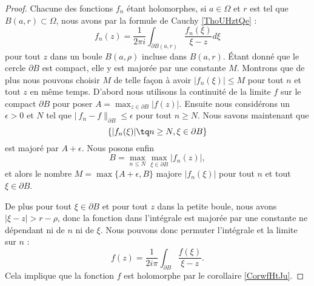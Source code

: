\begin{proof}
    Chacune des fonctions \( f_n\) étant holomorphes, si \( a\in \Omega\) et \( r\) est tel que \( B(a,r)\subset \Omega\), nous avons par la formule de Cauchy \ref{ThoUHztQe} :
    \begin{equation}
        f_n(z)=\frac{1}{ 2\pi i }\int_{\partial B(a,r)}\frac{ f_n(\xi) }{ \xi-z }d\xi
    \end{equation}
    pour tout \( z\) dans un boule \( B(a,\rho)\) incluse dans \( B(a,r)\). Étant donné que le cercle \( \partial B\) est compact, elle y est majorée par une constante \( M\). Montrons que de plus nous pouvons choisir \( M\) de telle façon à avoir \( | f_n(\xi) |\leq M\) pour tout \( n\) et tout \( z\) en même temps. D'abord nous utilisons la continuité de la limite \( f\) sur le compact \( \partial B \) pour poser \( A=\max_{z\in\partial B}| f(z) |\). Ensuite nous considérons un \( \epsilon>0\) et \( N\) tel que \( |\ f_n-f \|_{\partial B}\leq \epsilon\) pour tout \( n\geq N\). Nous savons maintenant que
    \begin{equation}
        \{ | f_n(\xi) |\tq n \geq N,\xi\in\partial B \}
    \end{equation}
    est majoré par \( A+\epsilon\). Nous posons enfin
    \begin{equation}
        B=\max_{n\leq N}\max_{\xi\in\partial B}| f_n(z) |,
    \end{equation}
    et alors le nombre \( M=\max\{ A+\epsilon,B \}\) majore \( | f_n(\xi) |\) pour tout \( n\) et tout \( \xi\in\partial B\).
    
    De plus pour tout \( \xi\in\partial B\) et pour tout \( z\) dans la petite boule, nous avons \( | \xi-z |>r-\rho\), donc  la fonction dans l'intégrale est majorée par une constante ne dépendant ni de \( n\) ni de \( \xi\). Nous pouvons donc permuter l'intégrale et la limite sur \( n\) :
    \begin{equation}
        f(z)=\frac{1}{ 2i\pi }\int_{\partial B}\frac{ f(\xi) }{ \xi-z }.
    \end{equation}
    Cela implique que la fonction \( f\) est holomorphe par le corollaire \ref{CorwfHtJu}.


\end{proof}
